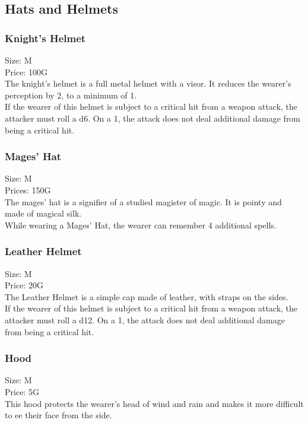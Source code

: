 \subsection{Hats and Helmets}

\subsubsection{Knight's Helmet}
Size: M\\
Price: 100G\\
The knight's helmet is a full metal helmet with a visor.
It reduces the wearer's perception by 2, to a minimum of 1.\\
If the wearer of this helmet is subject to a critical hit from a weapon attack, the attacker must roll a d6.
On a 1, the attack does not deal additional damage from being a critical hit.\\

\subsubsection{Mages' Hat}
Size: M\\
Prices: 150G\\
The mages' hat is a signifier of a studied magister of magic.
It is pointy and made of magical silk.\\
While wearing a Mages' Hat, the wearer can remember 4 additional spells.\\

\subsubsection{Leather Helmet}
Size: M\\
Price: 20G\\
The Leather Helmet is a simple cap made of leather, with straps on the sides.\\
If the wearer of this helmet is subject to a critical hit from a weapon attack, the attacker must roll a d12.
On a 1, the attack does not deal additional damage from being a critical hit.\\

\subsubsection{Hood}
Size: M\\
Price: 5G\\
This hood protects the wearer's head of wind and rain and makes it more difficult to ee their face from the side.\\

